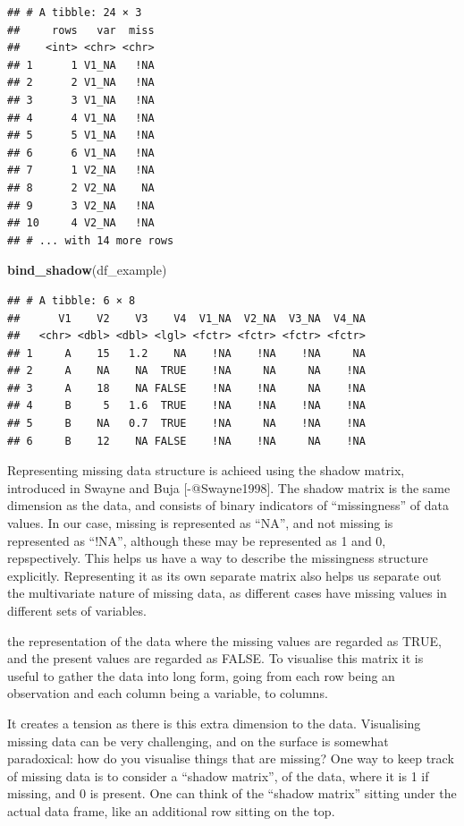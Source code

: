 \documentclass[]{article}
\newenvironment{Shaded}{\begin{snugshade}}{\end{snugshade}}
\newcommand{\KeywordTok}[1]{\textcolor[rgb]{0.13,0.29,0.53}{\textbf{{#1}}}}
\newcommand{\NormalTok}[1]{{#1}}
\begin{document}
\begin{verbatim}
## # A tibble: 24 × 3
##     rows   var  miss
##    <int> <chr> <chr>
## 1      1 V1_NA   !NA
## 2      2 V1_NA   !NA
## 3      3 V1_NA   !NA
## 4      4 V1_NA   !NA
## 5      5 V1_NA   !NA
## 6      6 V1_NA   !NA
## 7      1 V2_NA   !NA
## 8      2 V2_NA    NA
## 9      3 V2_NA   !NA
## 10     4 V2_NA   !NA
## # ... with 14 more rows
\end{verbatim}

\begin{Shaded}
\begin{Highlighting}[]
\KeywordTok{bind_shadow}\NormalTok{(df_example)}
\end{Highlighting}
\end{Shaded}

\begin{verbatim}
## # A tibble: 6 × 8
##      V1    V2    V3    V4  V1_NA  V2_NA  V3_NA  V4_NA
##   <chr> <dbl> <dbl> <lgl> <fctr> <fctr> <fctr> <fctr>
## 1     A    15   1.2    NA    !NA    !NA    !NA     NA
## 2     A    NA    NA  TRUE    !NA     NA     NA    !NA
## 3     A    18    NA FALSE    !NA    !NA     NA    !NA
## 4     B     5   1.6  TRUE    !NA    !NA    !NA    !NA
## 5     B    NA   0.7  TRUE    !NA     NA    !NA    !NA
## 6     B    12    NA FALSE    !NA    !NA     NA    !NA
\end{verbatim}

Representing missing data structure is achieed using the shadow matrix,
introduced in Swayne and Buja {[}-@Swayne1998{]}. The shadow matrix is
the same dimension as the data, and consists of binary indicators of
``missingness'' of data values. In our case, missing is represented as
``NA'', and not missing is represented as ``!NA'', although these may be
represented as 1 and 0, repspectively. This helps us have a way to
describe the missingness structure explicitly. Representing it as its
own separate matrix also helps us separate out the multivariate nature
of missing data, as different cases have missing values in different
sets of variables.

the representation of the data where the missing values are regarded as
TRUE, and the present values are regarded as FALSE. To visualise this
matrix it is useful to gather the data into long form, going from each
row being an observation and each column being a variable, to columns.

It creates a tension as there is this extra dimension to the data.
Visualising missing data can be very challenging, and on the surface is
somewhat paradoxical: how do you visualise things that are missing? One
way to keep track of missing data is to consider a ``shadow matrix'', of
the data, where it is 1 if missing, and 0 is present. One can think of
the ``shadow matrix'' sitting under the actual data frame, like an
additional row sitting on the top.
\end{document}
